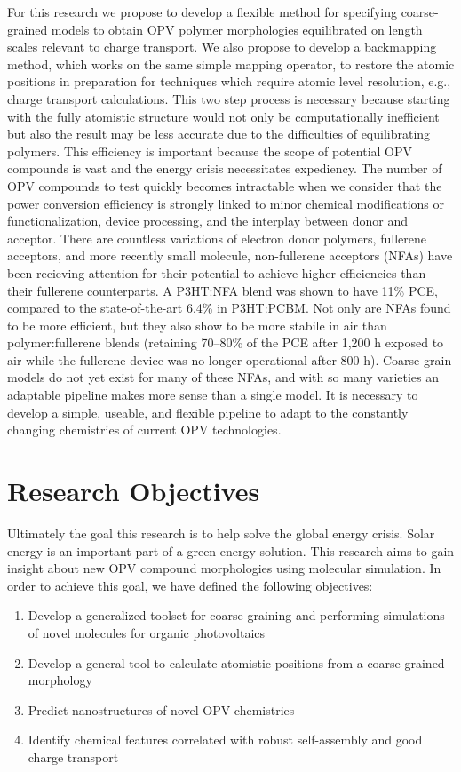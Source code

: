 For this research we propose to develop a flexible method for specifying coarse-grained models to obtain OPV polymer morphologies equilibrated on length scales relevant to charge transport.
We also propose to develop a backmapping method, which works on the same simple mapping operator, to restore the atomic positions in preparation for techniques which require atomic level resolution, e.g., charge transport calculations.
This two step process is necessary because starting with the fully atomistic structure would not only be computationally inefficient but also the result may be less accurate due to the difficulties of equilibrating polymers\cite{Gartner2019a}.
This efficiency is important because the scope of potential OPV compounds is vast and the energy crisis necessitates expediency.
The number of OPV compounds to test quickly becomes intractable when we consider that the power conversion efficiency is strongly linked to minor chemical modifications or functionalization, device processing, and the interplay between donor and acceptor\cite{Mazzio2015,Swick2019a}.
There are countless variations of electron donor polymers, fullerene acceptors, and more recently small molecule, non-fullerene acceptors (NFAs) have been recieving attention for their potential to achieve higher efficiencies than their fullerene counterparts\cite{Dou2013}.
A P3HT:NFA blend was shown to have 11\% PCE, compared to the state-of-the-art 6.4\% in P3HT:PCBM\cite{Baran2017}.
Not only are NFAs found to be more efficient, but they also show to be more stabile in air than polymer:fullerene blends (retaining 70--80\% of the PCE after 1,200 h exposed to air while the fullerene device was no longer operational after 800 h)\cite{Baran2017}.
Coarse grain models do not yet exist for many of these NFAs, and with so many varieties an adaptable pipeline makes more sense than a single model.
It is necessary to develop a simple, useable, and flexible pipeline to adapt to the constantly changing chemistries of current OPV technologies.

\section*{Research Objectives}

Ultimately the goal this research is to help solve the global energy crisis. 
Solar energy is an important part of a green energy solution.
This research aims to gain insight about new OPV compound morphologies using molecular simulation.
In order to achieve this goal, we have defined the following objectives:
\begin{enumerate}
    \item {Develop a generalized toolset for coarse-graining and performing simulations of novel molecules for organic photovoltaics}
    \item {Develop a general tool to calculate atomistic positions from a coarse-grained morphology}
    \item {Predict nanostructures of novel OPV chemistries}
    \item {Identify chemical features correlated with robust self-assembly and good charge transport}
\end{enumerate}


